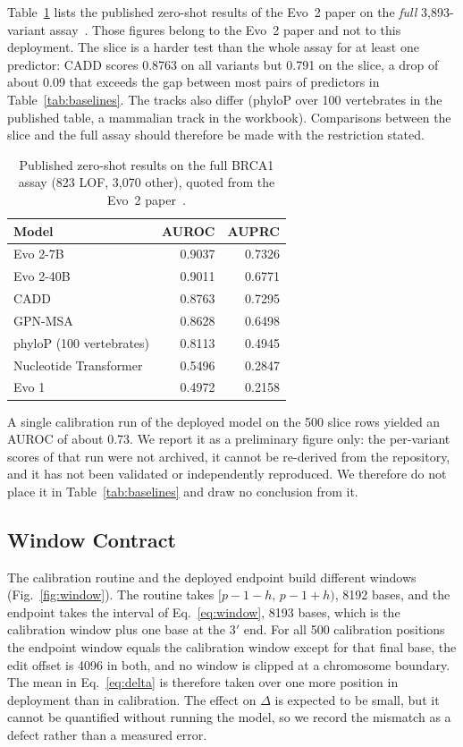 \documentclass[10pt,journal,a4paper]{IEEEtran}
\begin{document}
Table~\ref{tab:evo2} lists the published zero-shot results of the Evo~2 paper on the \emph{full} 3{,}893-variant assay~\cite{brixi2026evo2}. Those figures belong to the Evo~2 paper and not to this deployment. The slice is a harder test than the whole assay for at least one predictor: CADD scores 0.8763 on all variants but 0.791 on the slice, a drop of about 0.09 that exceeds the gap between most pairs of predictors in Table~\ref{tab:baselines}. The tracks also differ (phyloP over 100 vertebrates in the published table, a mammalian track in the workbook). Comparisons between the slice and the full assay should therefore be made with the restriction stated.

\begin{table}[!t]
\caption{Published zero-shot results on the full BRCA1 assay (823 LOF, 3{,}070 other), quoted from the Evo~2 paper~\cite{brixi2026evo2}.}
\label{tab:evo2}
\centering
\footnotesize
\begin{tabular}{@{}lrr@{}}
\toprule
Model & AUROC & AUPRC \\
\midrule
Evo 2-7B & 0.9037 & 0.7326 \\
Evo 2-40B & 0.9011 & 0.6771 \\
CADD & 0.8763 & 0.7295 \\
GPN-MSA & 0.8628 & 0.6498 \\
phyloP (100 vertebrates) & 0.8113 & 0.4945 \\
Nucleotide Transformer & 0.5496 & 0.2847 \\
Evo 1 & 0.4972 & 0.2158 \\
\bottomrule
\end{tabular}
\end{table}

A single calibration run of the deployed model on the 500 slice rows yielded an AUROC of about 0.73. We report it as a preliminary figure only: the per-variant scores of that run were not archived, it cannot be re-derived from the repository, and it has not been validated or independently reproduced. We therefore do not place it in Table~\ref{tab:baselines} and draw no conclusion from it.

\subsection{Window Contract}
\label{sec:res-window}
The calibration routine and the deployed endpoint build different windows (Fig.~\ref{fig:window}). The routine takes $[p-1-h,\,p-1+h)$, 8192 bases, and the endpoint takes the interval of Eq.~\eqref{eq:window}, 8193 bases, which is the calibration window plus one base at the 3$'$ end. For all 500 calibration positions the endpoint window equals the calibration window except for that final base, the edit offset is 4096 in both, and no window is clipped at a chromosome boundary. The mean in Eq.~\eqref{eq:delta} is therefore taken over one more position in deployment than in calibration. The effect on $\Delta$ is expected to be small, but it cannot be quantified without running the model, so we record the mismatch as a defect rather than a measured error.
\end{document}
